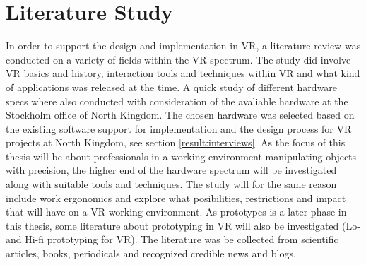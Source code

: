 \section{Literature Study}
In order to support the design and implementation in VR, a literature review was conducted on a variety of fields within the VR spectrum. The study did involve VR basics and history, interaction tools and techniques within VR and what kind of applications was released at the time. A quick study of different hardware specs where also conducted with consideration of the avaliable hardware at the Stockholm office of North Kingdom. The chosen hardware was selected based on the existing software support for implementation and the design process for VR projects at North Kingdom, see section \ref{result:interviews}. As the focus of this thesis will be about professionals in a working environment manipulating objects with precision, the higher end of the hardware spectrum will be investigated along with suitable tools and techniques. The study will for the same reason include work ergonomics and explore what posibilities, restrictions and impact that will have on a VR working environment. As prototypes is a later phase in this thesis, some literature about prototyping in VR will also be investigated (Lo- and Hi-fi prototyping for VR). The literature was be collected from scientific articles, books, periodicals and recognized credible news and blogs. 
